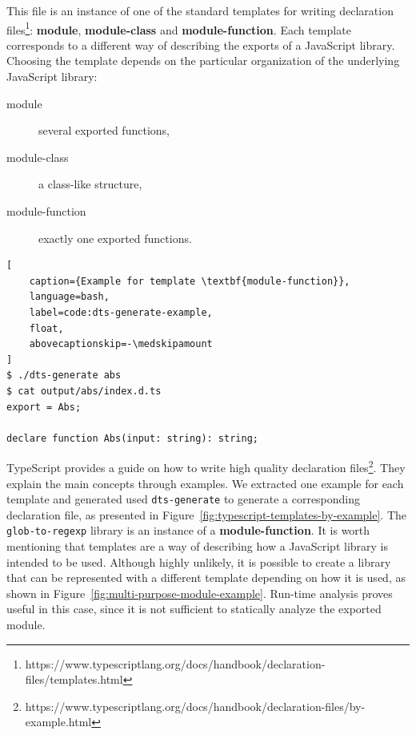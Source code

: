 \documentclass[english,cleveref,autoref,submission]{programming}
\newcommand{\figref}[1]{Figure~\ref{#1}}
\begin{document}
This file is an instance of one of the standard templates for writing
declaration
files\footnote{https://www.typescriptlang.org/docs/handbook/declaration-files/templates.html}:
\textbf{module}, \textbf{module-class} and
\textbf{module-function}. 
Each template corresponds to a different way of describing the exports
of a JavaScript library. Choosing the template depends on the
particular organization of the underlying JavaScript library:
\begin{description}
\item[module] several exported functions,
\item[module-class] a class-like structure,
\item[module-function] exactly one exported functions.
\end{description}

\begin{lstlisting}[
    caption={Example for template \textbf{module-function}},
    language=bash,
	label=code:dts-generate-example,
    float,
    abovecaptionskip=-\medskipamount
]
$ ./dts-generate abs
$ cat output/abs/index.d.ts 
export = Abs;

declare function Abs(input: string): string;
\end{lstlisting}

TypeScript provides a guide on how to write high quality declaration files\footnote{https://www.typescriptlang.org/docs/handbook/declaration-files/by-example.html}. They explain the main concepts through examples. We extracted one example for each template and generated used \texttt{dts-generate} to generate a corresponding declaration file, as presented in \figref{fig:typescript-templates-by-example}. The \texttt{glob-to-regexp} library is an instance of a \textbf{module-function}. It is worth mentioning that templates are a way of describing how a JavaScript library is intended to be used. Although highly unlikely, it is possible to create a library that can be represented with a different template depending on how it is used, as shown in \figref{fig:multi-purpose-module-example}. Run-time analysis proves useful in this case, since it is not sufficient to statically analyze the exported module.
\end{document}
